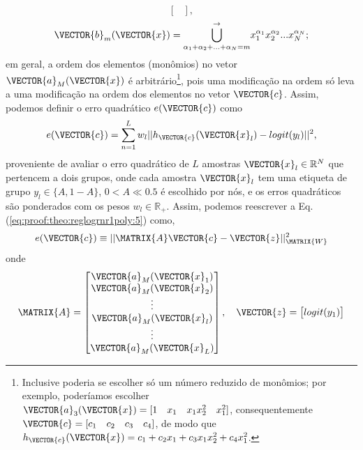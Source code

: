 \begin{myproofT}
\begin{equation}
\begin{bmatrix}
\end{bmatrix},
\end{equation}
\begin{equation}\label{eq:proof:theo:reglogrnr1poly:4}
\VECTOR{b}_m(\VECTOR{x})=
{\bigcup\limits_{\alpha_1+\alpha_2+...+\alpha_N=m}^{\rightarrow}}{x_1^{\alpha_1} x_2^{\alpha_2} ... x_N^{\alpha_N}};
\end{equation}
em geral, a ordem dos elementos (monômios) no vetor $\VECTOR{a}_M(\VECTOR{x})$ 
é arbitrário\footnote{Inclusive poderia se escolher só um número reduzido de monômios;
por exemplo, poderíamos escolher $\VECTOR{a}_3(\VECTOR{x})=[1\quad x_1\quad x_1 x_2^2\quad x_1^2]$,
consequentemente $\VECTOR{c}=[c_1\quad c_2\quad c_3\quad c_4]$,
de modo que $h_{\VECTOR{c}}(\VECTOR{x})=c_1 +c_2 x_1+c_3 x_1 x_2^2+c_4 x_1^2$.}, 
pois uma modificação na ordem só leva a uma modificação na ordem dos elementos no vetor $\VECTOR{c}$.
Assim, podemos definir o erro quadrático $e(\VECTOR{c})$ como
\begin{equation}\label{eq:proof:theo:reglogrnr1poly:5}
e(\VECTOR{c}) =  \sum_{n=1}^{L} w_l||h_{\VECTOR{c}}(\VECTOR{x}_l)-logit(y_l)||^2,
\end{equation}
proveniente de avaliar o erro quadrático de $L$ amostras $\VECTOR{x}_l \in \mathbb{R}^{N}$ que pertencem a dois grupos, 
onde cada amostra $\VECTOR{x}_l$ tem uma etiqueta de grupo $y_l\in \{A,1-A\}$, 
 $0<A\ll 0.5$ é escolhido por nós, 
e os erros quadráticos são ponderados com os pesos $w_l \in \mathbb{R}_+$.
Assim, podemos reescrever a Eq. (\ref{eq:proof:theo:reglogrnr1poly:5}) como,
\begin{equation}\label{eq:proof:theo:reglogrnr1poly:6}
e(\VECTOR{c}) \equiv ||\MATRIX{A}\VECTOR{c}-\VECTOR{z}||_{\MATRIX{W}}^2 
\end{equation}
onde
\begin{equation}\label{eq:proof:reglogrnr1poly:7}
\MATRIX{A}=\begin{bmatrix}
\VECTOR{a}_M(\VECTOR{x}_1)\\
\VECTOR{a}_M(\VECTOR{x}_2)\\
\vdots\\
\VECTOR{a}_M(\VECTOR{x}_l)\\
\vdots\\
\VECTOR{a}_M(\VECTOR{x}_L)\\
\end{bmatrix},
\quad
\VECTOR{z}=
\begin{bmatrix}
logit(y_1)  \\

\end{bmatrix}
\end{equation}
\end{myproofT}
